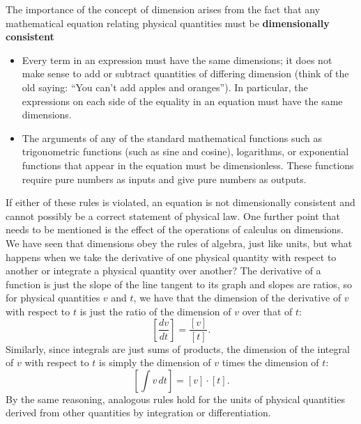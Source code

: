 \documentclass{report}
\begin{document}
    \bigbreak \noindent 
    The importance of the concept of dimension arises from the fact that any mathematical equation relating physical quantities must be \textbf{dimensionally consistent}
    \begin{itemize}
        \item Every term in an expression must have the same dimensions; it does not make sense to add or subtract quantities of differing dimension (think of the old saying: “You can’t add apples and oranges”). In particular, the expressions on each side of the equality in an equation must have the same dimensions.
        \item The arguments of any of the standard mathematical functions such as trigonometric functions (such as sine and cosine), logarithms, or exponential functions that appear in the equation must be dimensionless. These functions require pure numbers as inputs and give pure numbers as outputs.
    \end{itemize}
    \bigbreak \noindent 
    If either of these rules is violated, an equation is not dimensionally consistent and cannot possibly be a correct statement of physical law.
    \bigbreak \noindent 
    One further point that needs to be mentioned is the effect of the operations of calculus on dimensions. We have seen that dimensions obey the rules of algebra, just like units, but what happens when we take the derivative of one physical quantity with respect to another or integrate a physical quantity over another? The derivative of a function is just the slope of the line tangent to its graph and slopes are ratios, so for physical quantities \( v \) and \( t \), we have that the dimension of the derivative of \( v \) with respect to \( t \) is just the ratio of the dimension of \( v \) over that of \( t \):
    \[
        \left[ \frac{dv}{dt} \right] = \frac{[v]}{[t]}.
    \]
    Similarly, since integrals are just sums of products, the dimension of the integral of \( v \) with respect to \( t \) is simply the dimension of \( v \) times the dimension of \( t \):
    \[
        \left[ \int v \, dt \right] = [v] \cdot [t].
    \]
    By the same reasoning, analogous rules hold for the units of physical quantities derived from other quantities by integration or differentiation.
\end{document}
